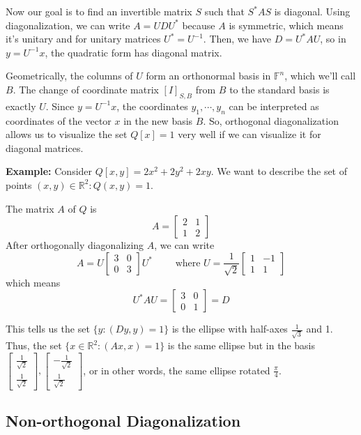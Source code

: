 \documentclass[a4paper,10pt]{book}
\newcommand{\R}{\mathbb{R}}
\newcommand{\F}{\mathbb{F}}
\theoremstyle{plain}
\theoremstyle{plain}
\theoremstyle{definition}
\begin{document}
Now our goal is to find an invertible matrix $S$ such that $S^{*} AS$ is diagonal. Using diagonalization, we can write $A = UDU^{*}$ because $A$ is symmetric, which means it's unitary and for unitary matrices $U^{*} = U^{-1}$. Then, we have $D = U^{*} AU$, so in $y = U^{-1} x$, the quadratic form has diagonal matrix. 

Geometrically, the columns of $U$ form an orthonormal basis in $\F^{n}$, which we'll call $B$. The change of coordinate matrix $[I]_{S, B}$ from $B$ to the standard basis is exactly $U$. Since $y = U^{-1} x$, the coordinates $y_{1}, \cdots, y_{n}$ can be interpreted as coordinates of the vector $x$ in the new basis $B$. So, orthogonal diagonalization allows us to visualize the set $Q[x] = 1$ very well if we can visualize it for diagonal matrices. 

\textbf{Example:} Consider $Q[x, y] = 2x^{2} + 2y^{2} + 2xy$. We want to describe the set of points $(x, y) \in \R^{2} : Q(x, y) = 1$. 

The matrix $A$ of $Q$ is 
$$A = \begin{bmatrix}
2 & 1 \\
1 & 2
\end{bmatrix}$$ 
After orthogonally diagonalizing $A$, we can write 
$$A = U \begin{bmatrix}
3 & 0 \\
0 & 3
\end{bmatrix} U^{*} \qquad \text{ where } U = \frac{1}{\sqrt{2}} \begin{bmatrix}
1 & -1 \\
1 & 1
\end{bmatrix}$$
which means
$$U^{*} AU = \begin{bmatrix}
3 & 0 \\
0 & 1
\end{bmatrix} = D$$

This tells us the set $\{y : (Dy, y) = 1\}$ is the ellipse with half-axes $\frac{1}{\sqrt{3}}$ and 1. Thus, the set $\{x \in \R^{2}: (Ax, x) = 1 \}$ is the same ellipse but in the basis $\begin{bmatrix}
\frac{1}{\sqrt{2}} \\
\frac{1}{\sqrt{2}}
\end{bmatrix}, \begin{bmatrix}
-\frac{1}{\sqrt{2}} \\
\frac{1}{\sqrt{2}}
\end{bmatrix}$, or in other words, the same ellipse rotated $\frac{\pi}{4}$. 

\subsection{Non-orthogonal Diagonalization} 
\end{document}

